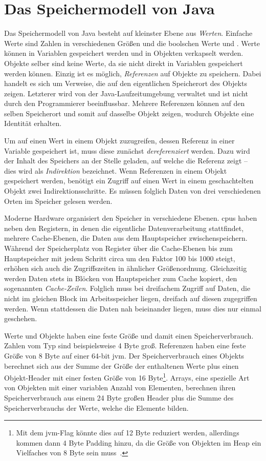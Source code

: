 \section{Das Speichermodell von Java}\label{sec:memory-model}

Das Speichermodell von Java besteht auf kleinster Ebene aus \emph{Werten}.
Einfache Werte sind Zahlen in verschiedenen Größen und die boolschen Werte  und .
Werte können in Variablen gespeichert werden und in Objekten verkapselt werden.
Objekte selber sind keine Werte, da sie nicht direkt in Variablen gespeichert werden können.
Einzig ist es möglich, \emph{Referenzen} auf Objekte zu speichern.
Dabei handelt es sich um Verweise, die auf den eigentlichen Speicherort des Objekts zeigen.
Letzterer wird von der Java-Laufzeitumgebung verwaltet und ist nicht durch den Programmierer beeinflussbar.
Mehrere Referenzen können auf den selben Speicherort und somit auf dasselbe Objekt zeigen, wodurch Objekte eine Identität erhalten.

Um auf einen Wert in einem Objekt zuzugreifen, dessen Referenz in einer Variable gespeichert ist, muss diese zunächst \emph{dereferenziert} werden.
Dazu wird der Inhalt des Speichers an der Stelle geladen, auf welche die Referenz zeigt -- dies wird als \emph{Indirektion} bezeichnet.
Wenn Referenzen in einem Objekt gespeichert werden, benötigt ein Zugriff auf einen Wert in einem geschachtelten Objekt zwei Indirektionsschritte.
Es müssen folglich Daten von drei verschiedenen Orten im Speicher gelesen werden.

Moderne Hardware organisiert den Speicher in verschiedene Ebenen.
\acp{cpu} haben neben den Registern, in denen die eigentliche Datenverarbeitung stattfindet, mehrere Cache-Ebenen, die Daten aus dem Hauptspeicher zwischenspeichern.
Während der Speicherplatz von Register über die Cache-Ebenen bis zum Hauptspeicher mit jedem Schritt circa um den Faktor 100 bis 1000 steigt, erhöhen sich auch die Zugriffszeiten in ähnlicher Größenordnung.
Gleichzeitig werden Daten stets in Blöcken von Hauptspeicher zum Cache kopiert, den sogenannten \emph{Cache-Zeilen}.
Folglich muss bei dreifachem Zugriff auf Daten, die nicht im gleichen Block im Arbeitsspeicher liegen, dreifach auf diesen zugegriffen werden.
Wenn stattdessen die Daten nah beieinander liegen, muss dies nur einmal geschehen.

Werte und Objekte haben eine feste Größe und damit einen Speicherverbrauch.
Zahlen vom Typ  sind beispielsweise 4 Byte groß.
Referenzen haben eine feste Größe von 8 Byte auf einer 64-bit \ac{jvm}.
Der Speicherverbrauch eines Objekts berechnet sich aus der Summe der Größe der enthaltenen Werte plus einen Objekt-Header mit einer festen Größe von 16 Byte\footnote{Mit dem \ac{jvm}-Flag  könnte dies auf 12 Byte reduziert werden, allerdings kommen dann 4 Byte Padding hinzu, da die Größe von Objekten im Heap ein Vielfaches von 8 Byte sein muss~\cite{compressed-oops}.}.
Arrays, eine spezielle Art von Objekten mit einer variablen Anzahl von Elementen, berechnen ihren Speicherverbrauch aus einem 24 Byte großen Header plus die Summe des Speicherverbrauchs der Werte, welche die Elemente bilden.
~\cite{compressed-oops}

